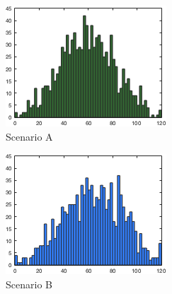 \begin{figure}[h]
        \centering
        \begin{subfigure}[h]{0.32\textwidth}
                \includegraphics[width=\textwidth]{./img/5/HA-4RuleBased}
                \caption{Scenario A}
                \label{fig:histogramA}
        \end{subfigure}
        \begin{subfigure}[h]{0.32\textwidth}
                \includegraphics[width=\textwidth]{./img/5/HB-1RuleBased_3Random}
                \caption{Scenario B}
                \label{fig:histogramB}
        \end{subfigure}
        \begin{subfigure}[h]{0.32\textwidth}

\end{subfigure}
\end{figure}
